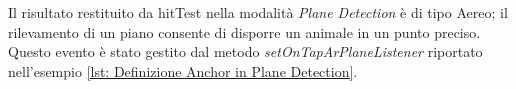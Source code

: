 \documentclass[crop=false, class=book]{standalone}
\begin{document}
	\begin{flushleft}
		Il risultato restituito da hitTest nella modalità \emph{Plane Detection} è di tipo Aereo; il rilevamento di un piano 			consente di disporre un animale in un punto preciso. Questo evento è stato gestito dal metodo 									\textit{setOnTapArPlaneListener} riportato nell'esempio \vref{lst: Definizione Anchor in Plane Detection}.\\
	\end{flushleft}
	
	
			
	
\end{document}
